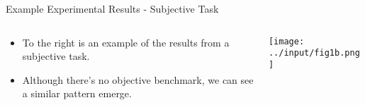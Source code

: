 \documentclass[11pt, aspectratio=169]{beamer}
\begin{document}
\begin{frame}{Example Experimental Results - Subjective Task}
    
    \begin{columns}
    
        \begin{column}{0.5\textwidth}
            \begin{itemize}
                \item To the right is an example of 
                    the results from a subjective task.
                \item Although there's no objective benchmark, 
                    we can see a similar pattern emerge.
            \end{itemize}
        \end{column}
    
        \begin{column}{0.5\textwidth}
            \texttt{[image: ../input/fig1b.png]}
        \end{column}
    
    \end{columns}
    
\end{frame}

\end{document}
